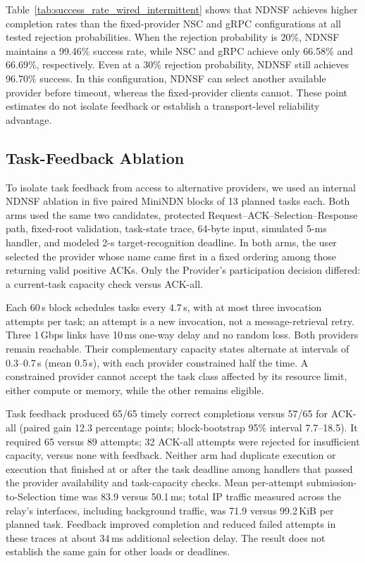Table~\ref{tab:success_rate_wired_intermittent} shows that NDNSF achieves higher completion rates than the fixed-provider NSC and gRPC configurations at all tested rejection probabilities. When the rejection probability is 20\%, NDNSF maintains a 99.46\% success rate, while NSC and gRPC achieve only 66.58\% and 66.69\%, respectively. Even at a 30\% rejection probability, NDNSF still achieves 96.70\% success. In this configuration, NDNSF can select another available provider before timeout, whereas the fixed-provider clients cannot. These point estimates do not isolate feedback or establish a transport-level reliability advantage.

\subsection{Task-Feedback Ablation}
\label{sec:task-feedback-ablation}

To isolate task feedback from access to alternative providers, we used an internal NDNSF ablation in five paired MiniNDN blocks of 13 planned tasks each. Both arms used the same two candidates, protected Request--ACK--Selection--Response path, fixed-root validation, task-state trace, 64-byte input, simulated 5-ms handler, and modeled 2-s target-recognition deadline. In both arms, the user selected the provider whose name came first in a fixed ordering among those returning valid positive ACKs. Only the Provider's participation decision differed: a current-task capacity check versus ACK-all.

Each 60\,s block schedules tasks every 4.7\,s, with at most three invocation attempts per task; an attempt is a new invocation, not a message-retrieval retry. Three 1\,Gbps links have 10\,ms one-way delay and no random loss. Both providers remain reachable. Their complementary capacity states alternate at intervals of 0.3--0.7\,s (mean 0.5\,s), with each provider constrained half the time. A constrained provider cannot accept the task class affected by its resource limit, either compute or memory, while the other remains eligible.

Task feedback produced 65/65 timely correct completions versus 57/65 for ACK-all (paired gain 12.3 percentage points; block-bootstrap 95\% interval 7.7--18.5). It required 65 versus 89 attempts; 32 ACK-all attempts were rejected for insufficient capacity, versus none with feedback. Neither arm had duplicate execution or execution that finished at or after the task deadline among handlers that passed the provider availability and task-capacity checks. Mean per-attempt submission-to-Selection time was 83.9 versus 50.1\,ms; total IP traffic measured across the relay's interfaces, including background traffic, was 71.9 versus 99.2\,KiB per planned task. Feedback improved completion and reduced failed attempts in these traces at about 34\,ms additional selection delay. The result does not establish the same gain for other loads or deadlines.

